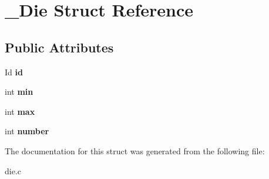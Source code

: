 \hypertarget{struct__Die}{}\section{\+\_\+\+Die Struct Reference}
\label{struct__Die}
\subsection*{Public Attributes}
\begin{DoxyCompactItemize}
\item 
\mbox{\label{struct__Die_a0887af562dda760409957f13619d36f1}} 
Id {\bfseries id}
\item 
\mbox{\label{struct__Die_ae45145b3f41842ec4e141e334760cc0a}} 
int {\bfseries min}
\item 
\mbox{\label{struct__Die_a082195a5946cd546ee5ef84785bdbf06}} 
int {\bfseries max}
\item 
\mbox{\label{struct__Die_a16b4c5c0c2bf0d152e1588c555a1dec0}} 
int {\bfseries number}
\end{DoxyCompactItemize}


The documentation for this struct was generated from the following file\+:\begin{DoxyCompactItemize}
\item 
die.\+c\end{DoxyCompactItemize}
